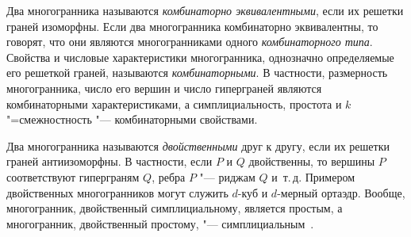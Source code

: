 Два многогранника называются \emph{комбинаторно эквивалентными}, если их решетки граней изоморфны.
Если два многогранника комбинаторно эквивалентны, то говорят, что они являются многогранниками одного \emph{комбинаторного типа}.
Свойства и числовые характеристики многогранника, однозначно определяемые его решеткой граней, называются \emph{комбинаторными}.
В частности, размерность многогранника, число его вершин и число гиперграней являются комбинаторными характеристиками, а симплициальность, простота и $k$"=смежностность "--- комбинаторными свойствами.


Два многогранника называются \emph{двойственными} друг к другу, если их решетки граней антиизоморфны.
В частности, если $P$ и $Q$ двойственны, то вершины $P$ соответствуют гиперграням $Q$, ребра $P$ "--- риджам $Q$ и~т.\,д.
Примером двойственных многогранников могут служить $d$-куб и $d$-мерный ортаэдр.
Вообще, многогранник, двойственный симплициальному, является простым, 
а многогранник, двойственный простому, "--- симплициальным~\cite{Emelichev:1981}.


\begin{comment}
Пусть $d$-многогранник $P$ задан в виде $P = \conv(V)$ и $\bm{0}$ является внутренней точкой этого многогранника. (Выполнения последнего условия всегда можно добиться за счет операции смещения $\bm{x} \mapsto \bm{x} + \bm{x_0}$.)
\emph{Полярой} к $P$ называется многогранник
\[
P^* \coloneqq \Set*{\bm{x}\in \R^d \given \bm{y}^T \bm{x} \le 1, \ \forall \bm{y} \in V}.
\] 
Поляра $P^*$ является примером двойственного к $P$ многогранника~\cite{Emelichev:1981,ZieglerBook}.
\end{comment}


